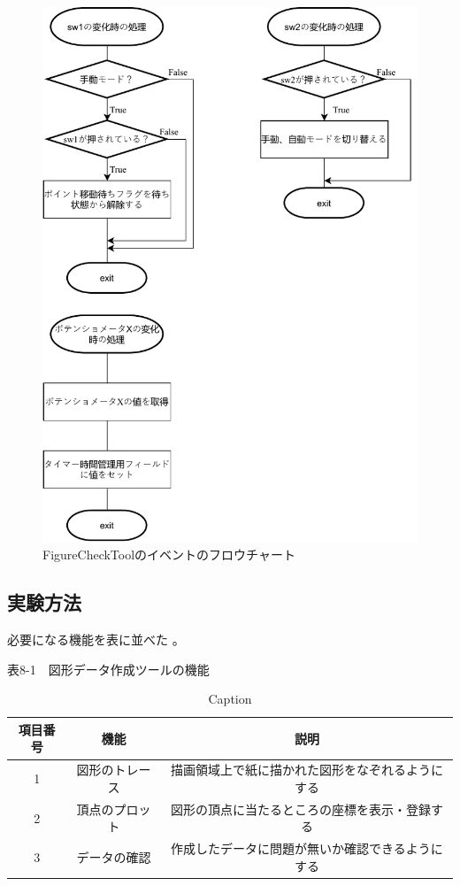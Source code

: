 \documentclass{jarticle}
\begin{document}
\begin{figure}[H]
    \centering
    \includegraphics{kumikomiKadai8-figureCheckToolEvent.pdf}
    \caption{FigureCheckToolのイベントのフロウチャート}
    \label{fig:my_label}
\end{figure}

\subsection{実験方法}

必要になる機能を表に並べた
。


\begin{table}[h]
    \caption{表8-1　図形データ作成ツールの機能}
    \centering
    \begin{tabular}{|c|c|c|}
    \hline
    \rowcolor[rgb]{0.9,0.9,0.9}
    項目番号&機能&説明\\
    \hline
     1    &図形のトレース &描画領域上で紙に描かれた図形をなぞれるようにする \\
     \hline
      2   & 頂点のプロット&図形の頂点に当たるところの座標を表示・登録する\\
       \hline  
     3  &データの確認  & 作成したデータに問題が無いか確認できるようにする\\
       \hline
    
       
    \end{tabular}
    \caption{Caption}
    \label{tab:my_label}
\end{table}
\end{document}
